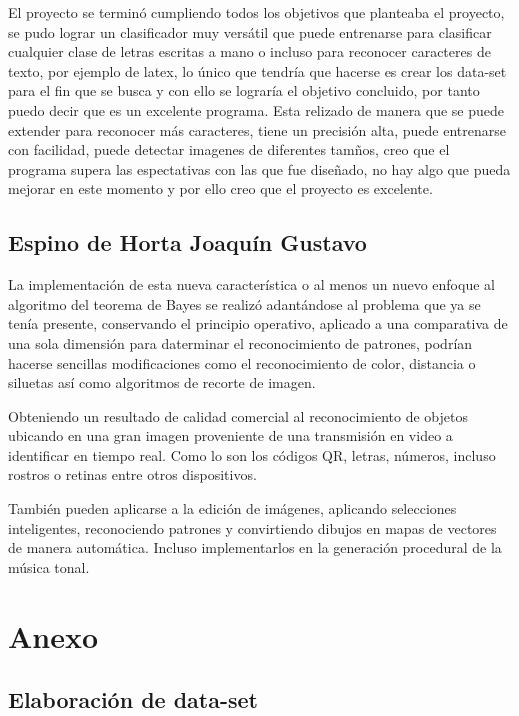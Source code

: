 \documentclass[
  spanish,
]{article}
\begin{document}
El proyecto se terminó cumpliendo todos los objetivos que planteaba el
proyecto, se pudo lograr un clasificador muy versátil que puede
entrenarse para clasificar cualquier clase de letras escritas a mano o
incluso para reconocer caracteres de texto, por ejemplo de latex, lo
único que tendría que hacerse es crear los data-set para el fin que se
busca y con ello se lograría el objetivo concluido, por tanto puedo
decir que es un excelente programa. Esta relizado de manera que se puede
extender para reconocer más caracteres, tiene un precisión alta, puede
entrenarse con facilidad, puede detectar imagenes de diferentes tamños,
creo que el programa supera las espectativas con las que fue diseñado,
no hay algo que pueda mejorar en este momento y por ello creo que el
proyecto es excelente.

\hypertarget{espino-de-horta-joaquuxedn-gustavo}{%
\subsection{Espino de Horta Joaquín
Gustavo}\label{espino-de-horta-joaquuxedn-gustavo}}

La implementación de esta nueva característica o al menos un nuevo
enfoque al algoritmo del teorema de Bayes se realizó adantándose al
problema que ya se tenía presente, conservando el principio operativo,
aplicado a una comparativa de una sola dimensión para daterminar el
reconocimiento de patrones, podrían hacerse sencillas modificaciones
como el reconocimiento de color, distancia o siluetas así como
algoritmos de recorte de imagen.

Obteniendo un resultado de calidad comercial al reconocimiento de
objetos ubicando en una gran imagen proveniente de una transmisión en
video a identificar en tiempo real. Como lo son los códigos QR, letras,
números, incluso rostros o retinas entre otros dispositivos.

También pueden aplicarse a la edición de imágenes, aplicando selecciones
inteligentes, reconociendo patrones y convirtiendo dibujos en mapas de
vectores de manera automática. Incluso implementarlos en la generación
procedural de la música tonal.

\hypertarget{anexo}{%
\section{Anexo}\label{anexo}}

\hypertarget{elaboraciuxf3n-de-data-set}{%
\subsection{Elaboración de data-set}\label{elaboraciuxf3n-de-data-set}}
\end{document}
